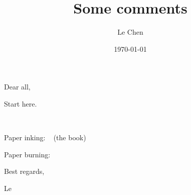 \documentclass[12pt]{article} %
\title{Some comments}
\author{Le Chen}
\date{\today}
\theoremstyle{plain}
\theoremstyle{definition}
\newcommand{\<}{\langle}
\renewcommand{\>}{\rangle}
\begin{document}
\maketitle
\noindent

Dear all,
\bigskip

Start here.

\cite{family.vicsek:85:scaling}
\cite{kardar.parisi.ea:86:dynamic}
\cite{barabasi.stanley:95:fractal}
\cite{zhang.zhang.ea:92:modeling}
~\cite{takeuchi.sano.ea:11:growing}

Paper inking: ~\cite{barabasi.stanley:95:fractal} (the book)

Paper burning: ~\cite{zhang.zhang.ea:92:modeling}

\bigskip
\noindent
Best regards,

\noindent
Le
\begingroup
\global\let\savedifeof=\ifeof
\def\ifeof#1{\global\let\ifeof=\savedifeof\iftrue}%
\printbibliography[title={References}]
\end{document}
